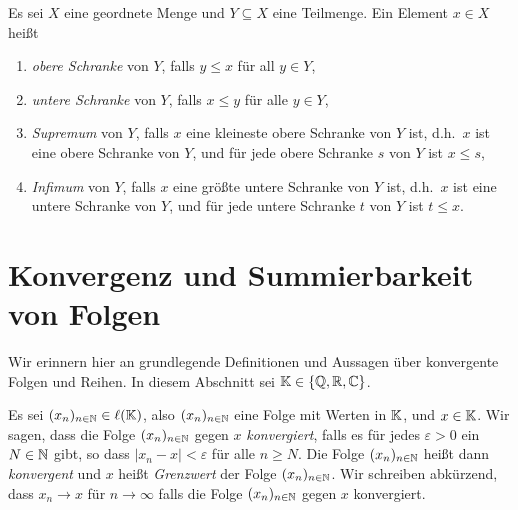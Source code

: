 \begin{defi}
 Es sei $X$ eine geordnete Menge und $Y \subseteq X$ eine Teilmenge. Ein Element $x \in X$ heißt
 \begin{enumerate}[label=\roman*)]
  \item
   \emph{obere Schranke} von $Y$, falls $y \leq x$ für all $y \in Y$,
  \item
   \emph{untere Schranke} von $Y$, falls $x \leq y$ für alle $y \in Y$,
  \item
   \emph{Supremum} von $Y$, falls $x$ eine kleineste obere Schranke von $Y$ ist, d.h.\ $x$ ist eine obere Schranke von $Y$, und für jede obere Schranke $s$ von $Y$ ist $x \leq s$,
  \item
   \emph{Infimum} von $Y$, falls $x$ eine größte untere Schranke von $Y$ ist, d.h.\ $x$ ist eine untere Schranke von $Y$, und für jede untere Schranke $t$ von $Y$ ist $t \leq x$.
 \end{enumerate}
\end{defi}


























\chapter{Konvergenz und Summierbarkeit von Folgen}\label{sec: sequences and series}
Wir erinnern hier an grundlegende Definitionen und Aussagen über konvergente Folgen und Reihen. In diesem Abschnitt sei $\mathbb{K} \in \{\mathbb{Q}, \mathbb{R}, \mathbb{C}\}$.


\begin{defi}
 Es sei $(x_n)_{n \in \mathbb{N}} \in \ell(\mathbb{K})$, also $(x_n)_{n \in \mathbb{N}}$ eine Folge mit Werten in $\mathbb{K}$, und $x \in \mathbb{K}$. Wir sagen, dass die Folge $(x_n)_{n \in \mathbb{N}}$ gegen $x$ \emph{konvergiert}, falls es für jedes $\varepsilon > 0$ ein $N \in \mathbb{N}$ gibt, so dass $|x_n - x| < \varepsilon$ für alle $n \geq N$. Die Folge $(x_n)_{n \in \mathbb{N}}$ heißt dann \emph{konvergent} und $x$ heißt \emph{Grenzwert} der Folge $(x_n)_{n \in \mathbb{N}}$. Wir schreiben abkürzend, dass $x_n \to x$ für $n \to \infty$ falls die Folge $(x_n)_{n \in \mathbb{N}}$ gegen $x$ konvergiert.
\end{defi}


